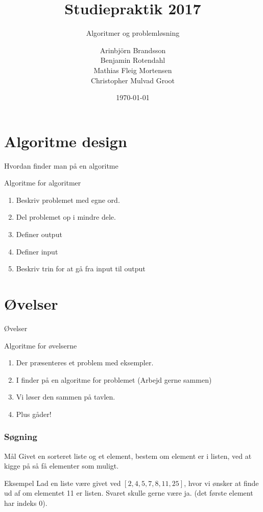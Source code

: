\documentclass[12pt,t]{beamer}
\title{Studiepraktik 2017}
\subtitle{Algoritmer og problemløsning}
\author{
        Arinbjörn Brandsson \\
        Benjamin Rotendahl  \\
        Mathias Fleig Mortensen \\
        Christopher Mulvad Groot\\
}
\date[]{\today}
\begin{document}
\frame[plain]{\titlepage}

\section{Algoritme design}
    \begin{frame}[c]{Hvordan finder man på en algoritme}
        \begin{block}{Algoritme for algoritmer}
            \begin{enumerate}
                \item Beskriv problemet med egne ord. \pause
                \item Del problemet op i mindre dele. \pause
                \item Definer output \pause
                \item Definer input \pause
                \item Beskriv trin for at gå fra input til output
            \end{enumerate}
        \end{block}
    \end{frame}

\section{Øvelser}
        \begin{frame}[t]{Øvelser}
            \begin{block}{Algoritme for øvelserne}
                \begin{enumerate}
                    \item Der præsenteres et problem med eksempler. \pause
                    \item I finder på en algoritme for problemet
                          (Arbejd gerne sammen) \pause
                    \item Vi løser den sammen på tavlen. \pause
                    \item Plus gåder!
                \end{enumerate}
            \end{block}
        \end{frame}

    \begin{frame}
      \frametitle{Søgning}
      \begin{block}{Mål}
      Givet en sorteret liste og et element, bestem om element er i listen,
      ved at kigge på så få elementer som muligt.
      \end{block}
      \pause

      \begin{exampleblock}{Eksempel}
      Lad en liste være givet ved $[2, 4, 5, 7, 8, 11, 25]$, hvor vi ønsker at
      finde ud af om elementet 11 er listen. Svaret skulle gerne være ja.
      (det første element har indeks 0).
      \end{exampleblock}
    \end{frame}
\end{document}
